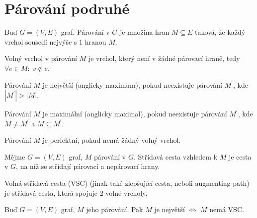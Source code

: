\section{Párování podruhé}
\begin{t_definition}
  Buď $G=(V,E)$ graf. Párování v $G$ je množina hran $M \subseteq E$ taková, že každý vrchol sousedí nejvýše s 1 hranou $M$.
\end{t_definition}

\begin{t_definition}
  Volný vrchol v párování $M$ je vrchol, který není v žádné párovací hraně, tedy $\forall e \in M: \; v \not\in e$.
\end{t_definition}

\begin{t_definition}
  Párování $M$ je největší (anglicky maximum), pokud neexistuje párování $M^\prime$, kde $|M^\prime| > |M|$.
\end{t_definition}

\begin{t_definition}
  Párování $M$ je maximální (anglicky maximal), pokud neexistuje párování $M^\prime$, kde $M \neq M^\prime$ a $M \subseteq M^\prime$.
\end{t_definition}

\begin{t_definition}
  Párování $M$ je perfektní, pokud nemá žádný volný vrchol.
\end{t_definition}

\begin{t_definition}
  Mějme $G=(V,E)$ graf, $M$ párování v $G$. Střídavá cesta vzhledem k $M$ je cesta v $G$, na níž se střídají párovací a nepárovací hrany.
\end{t_definition}

\begin{t_definition}
  Volná střídavá cesta (VSC) (jinak také zlepšující cesta, neboli augmenting path) je střídavá cesta, která spojuje 2 volné vrcholy.
\end{t_definition}

\begin{t_lemma}
  Buď $G=(V,E)$ graf, $M$ jeho párování. Pak $M$ je největší $\iff$ $M$ nemá VSC.
\end{t_lemma}

